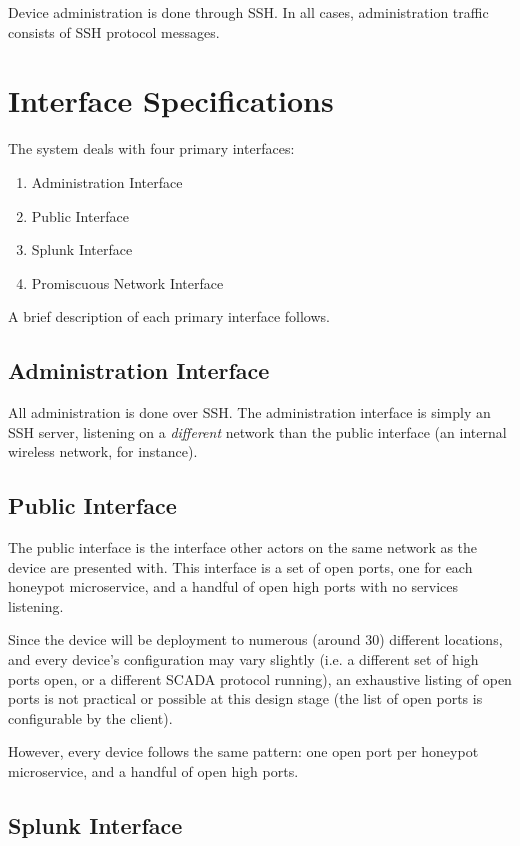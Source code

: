 Device administration is done through SSH. In all cases, administration
traffic consists of SSH protocol messages.


\section{Interface Specifications}

The system deals with four primary interfaces:

\begin{enumerate}
    \item Administration Interface
    \item Public Interface
    \item Splunk Interface
    \item Promiscuous Network Interface
\end{enumerate}

A brief description of each primary interface follows.

\subsection{Administration Interface}

All administration is done over SSH. The administration interface is
simply an SSH server, listening on a \textit{different} network than
the public interface (an internal wireless network, for instance).

\subsection{Public Interface}

The public interface is the interface other actors on the same network
as the device are presented with. This interface is a set of open ports,
one for each honeypot microservice, and a handful of open high ports with
no services listening.

Since the device will be deployment to numerous (around 30) different locations,
and every device's configuration may vary slightly (i.e. a different set of
high ports open, or a different SCADA protocol running), an exhaustive
listing of open ports is not practical or possible at this design stage
(the list of open ports is configurable by the client).

However, every device follows the same pattern: one open port per honeypot
microservice, and a handful of open high ports.

\subsection{Splunk Interface}

